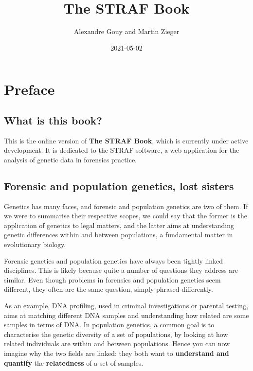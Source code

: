 \documentclass[
  a5paper]{book}
\title{The STRAF Book}
\author{Alexandre Gouy and Martin Zieger}
\date{2021-05-02}
\begin{document}
\maketitle

{
\setcounter{tocdepth}{1}
\tableofcontents
}
\hypertarget{preface}{%
\chapter*{Preface}\label{preface}}

\hypertarget{what-is-this-book}{%
\section*{What is this book?}\label{what-is-this-book}}

This is the online version of \textbf{The STRAF Book}, which is currently under
active development. It is dedicated to the STRAF software, a web application
for the analysis of genetic data in forensics practice.

\hypertarget{forensic-and-population-genetics-lost-sisters}{%
\section*{Forensic and population genetics, lost sisters}\label{forensic-and-population-genetics-lost-sisters}}

Genetics has many faces, and forensic and population genetics are two of them.
If we were to summarise their respective scopes, we could say that the former
is the application of genetics to legal matters, and the latter aims at
understanding genetic differences within and between populations, a fundamental matter in
evolutionary biology.

Forensic genetics and population genetics have always been tightly linked
disciplines. This is likely because quite a number of questions they address
are similar. Even though problems in forensics and population genetics seem
different, they often are the same question, simply phrased differently.

As an example, DNA profiling, used in criminal investigations or parental testing,
aims at matching different DNA samples and understanding how related are some
samples in terms of DNA. In population genetics, a common goal is to
characterise the genetic diversity of a set of populations, by looking at
how related individuals are within and between populations. Hence you can now
imagine why the two fields are linked: they both want to \textbf{understand and quantify}
the \textbf{relatedness} of a set of samples.
\end{document}
